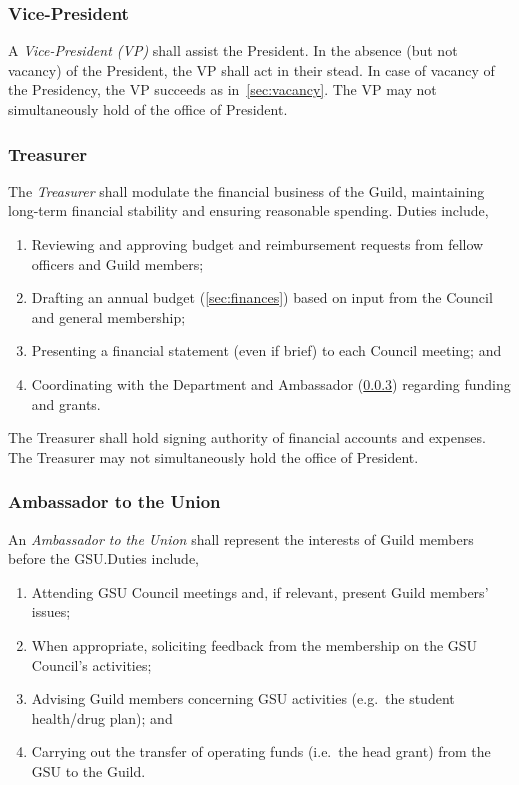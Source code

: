 \subsubsection{Vice-President}

A \textit{Vice-President (VP)} shall assist the President. In the absence (but
not vacancy) of the President, the VP shall act in their stead. In case of
vacancy of the Presidency, the VP succeeds as in~\ref{sec:vacancy}. The VP may
not simultaneously hold of the office of President.

\subsubsection{Treasurer}\label{sec:treasurer}

The \textit{Treasurer} shall modulate the financial business of the Guild,
maintaining long-term financial stability and ensuring reasonable spending.
Duties include,

\begin{enumerate}
      \item Reviewing and approving budget and reimbursement requests from fellow officers
            and Guild members;
      \item Drafting an annual budget (\ref{sec:finances}) based on input from the Council
            and general membership;
      \item Presenting a financial statement (even if brief) to each Council meeting; and
      \item Coordinating with the Department and Ambassador (\ref{sec:ambassador})
            regarding funding and grants.
\end{enumerate}
The Treasurer shall hold signing authority of financial accounts and expenses. The Treasurer may not simultaneously hold the office of President.

\subsubsection{Ambassador to the Union}\label{sec:ambassador}

An \textit{Ambassador to the Union} shall represent the interests of Guild
members before the GSU.\@ Duties include,

\begin{enumerate}
      \item Attending GSU Council meetings and, if relevant, present Guild members' issues;
      \item When appropriate, soliciting feedback from the membership on the GSU Council's
            activities;
      \item Advising Guild members concerning GSU activities (e.g.\ the student health/drug
            plan); and
      \item Carrying out the transfer of operating funds (i.e.\ the head grant) from the
            GSU to the Guild.
\end{enumerate}

